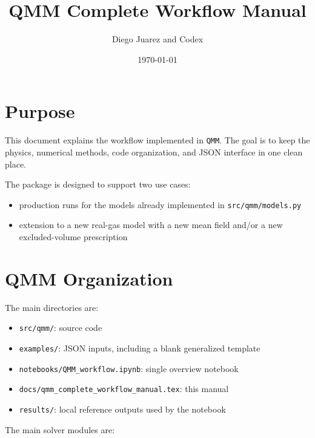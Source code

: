 \documentclass[11pt]{article}
\title{QMM Complete Workflow Manual}
\author{Diego Juarez and Codex}
\date{\today}
\begin{document}
\maketitle
\tableofcontents
\newpage

\section{Purpose}

This document explains the workflow implemented in \texttt{QMM}.  The goal is
to keep the physics, numerical methods, code organization, and JSON interface
in one clean place.

The package is designed to support two use cases:

\begin{itemize}
\item production runs for the models already implemented in
\texttt{src/qmm/models.py}
\item extension to a new real-gas model with a new mean field and/or a new
excluded-volume prescription
\end{itemize}

\section{QMM Organization}

The main directories are:

\begin{itemize}
\item \texttt{src/qmm/}: source code
\item \texttt{examples/}: JSON inputs, including a blank generalized template
\item \texttt{notebooks/QMM\_workflow.ipynb}: single overview notebook
\item \texttt{docs/qmm\_complete\_workflow\_manual.tex}: this manual
\item \texttt{results/}: local reference outputs used by the notebook
\end{itemize}

The main solver modules are:
\end{document}

